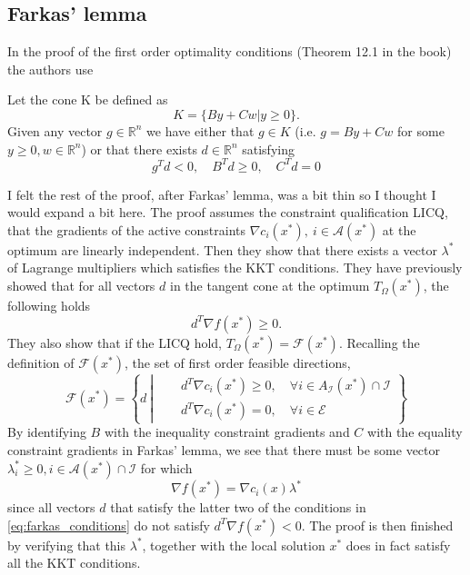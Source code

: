 \subsection{Farkas' lemma}
In the proof of the first order optimality conditions (Theorem 12.1 in the book) the authors use
\begin{Lma}[Farkas]
    Let the cone K be defined as
    \[
        K = \{By + Cw|y\geq 0\}.
    \]
    Given any vector $g\in\mathbb{R}^n$ we have either that $g\in K$ (i.e. $g = By + Cw$ for some $y\geq 0, w \in \mathbb{R}^n$) or that there exists $d\in\mathbb{R}^n$ satisfying
    \begin{equation}
        g^T d < 0, \quad B^Td \geq 0, \quad C^T d = 0
        \label{eq:farkas_conditions}
    \end{equation}
\end{Lma}
I felt the rest of the proof, after Farkas' lemma, was a bit thin so I thought I would expand a bit here.
The proof assumes the constraint qualification LICQ, that the gradients of the active constraints $\nabla c_i(x^*), \> i\in \mathcal{A}(x^*)$ at the optimum are linearly independent.
Then they show that there exists a vector $\lambda^*$ of Lagrange multipliers which satisfies the KKT conditions.
They have previously showed that for all vectors $d$ in the tangent cone at the optimum $T_\Omega(x^*)$, the following holds
\[
    d^T\nabla f(x^*) \geq 0.
\]
They also show that if the LICQ hold, $T_\Omega(x^*) = \mathcal{F}(x^*)$. Recalling the definition of $\mathcal{F}(x^*)$, the set of first order feasible directions,
\[
    \mathcal{F}(x^*) = \left\{ d \> \left\vert \begin{aligned}
        \quad & d^T \nabla c_i(x^*) \geq 0,\quad \forall i \in A_\mathcal{I}(x^*)\cap\mathcal{I} \\
        \quad & d^T \nabla c_i(x^*) = 0, \quad \forall i\in\mathcal{E}
    \end{aligned}\right.\right\}
\]
By identifying $B$ with the inequality constraint gradients and $C$ with the equality constraint gradients in Farkas' lemma, we see that there must be some vector $\lambda_i^* \geq 0, i \in \mathcal{A}(x^*) \cap \mathcal{I}$ for which
\[
    \nabla f(x^*) = \nabla c_i(x)\lambda^*
\]
since all vectors $d$ that satisfy the latter two of the conditions in \eqref{eq:farkas_conditions} do not satisfy $d^T\nabla f(x^*) < 0$.
The proof is then finished by verifying that this $\lambda^*$, together with the local solution $x^*$ does in fact satisfy all the KKT conditions.
